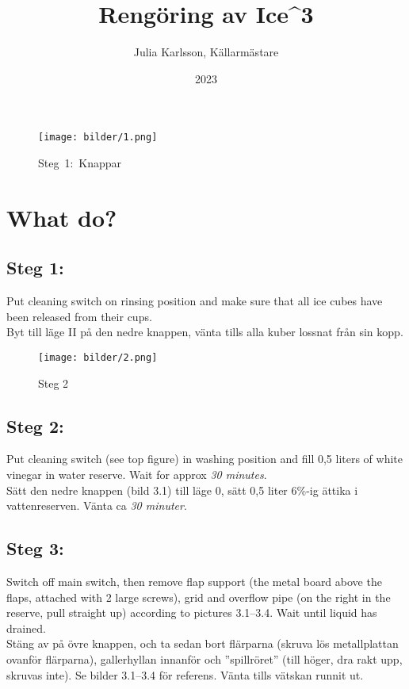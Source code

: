 \documentclass{article}
\title{Rengöring av Ice^3}
\author{Julia Karlsson, Källarmästare}
\date{2023}
\begin{document}
\maketitle{}


\begin{wrapfigure}[3]{r}{0.3\textwidth}
    \raggedright
    \vspace{-6cm}
    \texttt{[image: bilder/1.png]}
    \vspace{-3.1cm}
    \caption*{\qquad \qquad \qquad \qquad  \quad \mbox{Steg 1: Knappar}}
\end{wrapfigure}



\section*{What do?}
\subsection*{Steg 1:}
Put cleaning switch on rinsing position and make sure that all ice cubes have been released from their cups. \\ Byt till läge II på den nedre knappen, vänta tills alla kuber lossnat från sin kopp. 

\begin{wrapfigure}[4]{r}{0.19\textwidth}
    \raggedright
    \vspace{-2cm}
    \texttt{[image: bilder/2.png]}
    \caption*{\hspace{1.5cm} Steg 2}
\end{wrapfigure}



\subsection*{Steg 2:}
Put cleaning switch (see top figure) in washing position and fill 0,5 liters of white vinegar in water reserve. Wait for approx \emph{30 minutes}. \\ Sätt den nedre knappen (bild 3.1) till läge 0, sätt 0,5 liter 6\%-ig ättika i vattenreserven. Vänta ca \emph{30 minuter}. 



\subsection*{Steg 3:}

Switch off main switch, then remove flap support (the metal board above the flaps, attached with 2 large screws), grid and overflow pipe (on the right in the reserve, pull straight up) according to pictures 3.1--3.4. Wait until liquid has drained. \\ Stäng av på övre knappen, och ta sedan bort flärparna (skruva lös metallplattan ovanför flärparna), gallerhyllan innanför och ''spillröret'' (till höger, dra rakt upp, skruvas inte). Se bilder 3.1--3.4 för referens. Vänta tills vätskan runnit ut.
\end{document}
